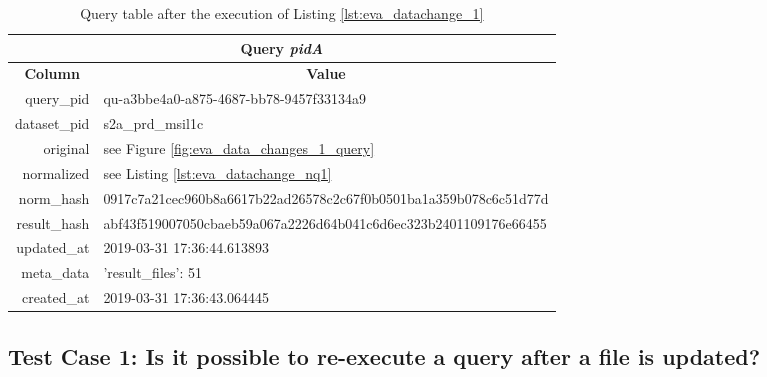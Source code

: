 \documentclass[draft,final]{vutinfth} %
\begin{document}
\begin{enumerate}
	\begin{table}[]
		\caption{Query table after the execution of Listing \ref{lst:eva_datachange_1}}
		\centering
		\begin{tabular}{|r|l|}
			\hline \multicolumn{2}{|c|}{\textbf{Query \textit{pidA}}} \\
			\hline \multicolumn{1}{|c|}{\textbf{Column}}  &  \multicolumn{1}{c|}{\textbf{Value}} \\ \hline
			query\_pid & qu-a3bbe4a0-a875-4687-bb78-9457f33134a9  \\ 
			dataset\_pid & s2a\_prd\_msil1c  \\ 
			original & see Figure \ref{fig:eva_data_changes_1_query}   \\
			normalized & see Listing \ref{lst:eva_datachange_nq1}  \\
			norm\_hash & 0917c7a21cec960b8a6617b22ad26578c2c67f0b0501ba1a359b078c6c51d77d  \\
			result\_hash & abf43f519007050cbaeb59a067a2226d64b041c6d6ec323b2401109176e66455   \\
			updated\_at & 2019-03-31 17:36:44.613893   \\
			meta\_data & {'result\_files': 51}  \\
			created\_at & 2019-03-31 17:36:43.064445   \\ \hline
		\end{tabular}
		\label{Tab:eva_datachanges1}
	\end{table}
\end{enumerate}
\newpage
\subsection{Test Case 1: Is it possible to re-execute a query after a file is updated?}	\label{Tab:eva_datachanges_tc1}
\end{document}
